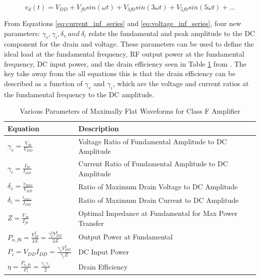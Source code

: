 \begin{equation}\label{eq:voltage_inf_series}
  v_{d}(t) = V_{DD} + V_{f0}sin(\omega t) + V_{3f0}sin(3\omega t) + V_{5f0}sin(5\omega t) + \ldots
\end{equation}


From Equations \ref{eq:current_inf_series} and \ref{eq:voltage_inf_series}, four new parameters: $\gamma_v, \gamma_i, \delta_v \ and \ \delta_i$ relate the fundamental and peak amplitude to the DC component for the drain and voltage. These parameters can be used to define the ideal load at the fundamental frequency, RF output power at the fundamental frequency, DC input power, and the drain efficiency seen in Table \ref{table:class_f_param} from \cite{Raab1997}. The key take away from the all equations this is that the drain efficiency can be described as a function of $\gamma_v$ and $\gamma_i$, which are the voltage and current ratios at the fundamental frequency to the DC amplitude.

\begin{table}
    \centering

    \label{table:class_f_param}
    \caption{Various Parameters of Maximally Flat Waveforms for Class F Amplifier }

    \begin{tabular}{|l|l|}
      \hline
      {Equation} & {Description} \\ \hline
      { $\gamma_v = \frac{V_{f0}}{V_{DD}} $ } & {Voltage Ratio of Fundamental Amplitude to DC Amplitude} \\ \hline

      { $\gamma_i = \frac{I_{f0}}{I_{DD}}$ } & {Current Ratio of Fundamental Amplitude to DC Amplitude} \\ \hline

      { $\delta_v = \frac{v_{max}}{V_{DD}}$} & {Ratio of Maximum Drain Voltage to DC Amplitude} \\ \hline

      { $\delta_i = \frac{i_{max}}{I_{DD}}$} & {Ratio of Maximum Drain Current to DC Amplitude} \\ \hline

      { $Z = \frac{V_{f0}}{I_{f0}}$}    & {Optimal Impedance at Fundamental for Max Power Transfer} \\ \hline

      { $P_{o,f0} = \frac{V^2_{f0}}{2Z} = \frac{\gamma_v^2 V_{DD}^2}{2Z}$} & {Output Power at Fundamental} \\ \hline

      { $P_i = V_{DD} I_{DD} = \frac{\gamma_v V_{DD}^2}{\gamma_i Z}$}      & {DC Input Power} \\ \hline

      { $\eta = \frac{P_{o,f0}}{P_i} = \frac{\gamma_v \gamma_i}{2}$}       & {Drain Efficiency} \\ \hline
    \end{tabular}
\end{table}

